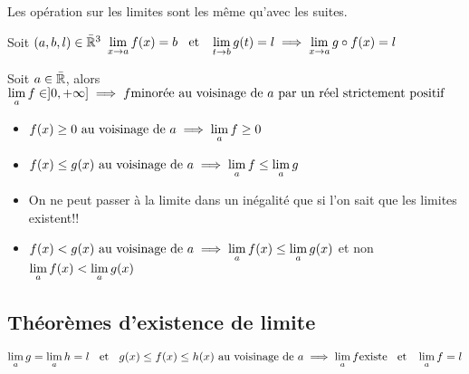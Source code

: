 \begin{rem}
Les opération sur les limites sont les même qu'avec les suites.
\end{rem}

\begin{prp} 
Soit $(a, b, l) \in \bar{\mathbb{R}}^3$
$\lim\limits_{x \to a} f(x) = b \;\;\text{ et }\;\; \lim\limits_{t \to b} g(t) = l
\implies \lim\limits_{x \to a} g \circ f(x) = l$
\end{prp}

\begin{prp} 
Soit $a \in \bar{\mathbb{R}}$, alors
$\lim\limits_{a} f \in ]0, +\infty] \implies f \text{minorée} \text{ au voisinage de }a
\text{ par un réel strictement positif}$
\end{prp}

\begin{prp} 
\begin{itemize}
\item $f(x) \geq 0 \text{ au voisinage de }a \implies \lim\limits_a f \geq 0$
\item $f(x) \leq g(x) \text{ au voisinage de }a \implies
\lim\limits_a f \leq \lim\limits_a g$
\end{itemize}
\end{prp}

\begin{rem} 
\begin{itemize}
    \item 
    \begin{att}
    On ne peut passer à la limite dans un inégalité que si l'on
    sait que les limites existent!!
    \end{att}
    \item
    \begin{att}
    $f(x) < g(x) \text{ au voisinage de }a \implies \lim\limits_a f(x) \leq \lim\limits_a g(x)$
    et non \\ $\lim\limits_a f(x) < \lim\limits_a g(x)$
    \end{att}
\end{itemize}
\end{rem}

\subsection{Théorèmes d'existence de limite}

\begin{thm}[d'encadrement]
$\lim\limits_a g = \lim\limits_a h = l \;\;\text{ et }\;\; g(x) \leq f(x) \leq h(x) \text{ au voisinage de }a
\implies \lim\limits_a f \text{existe} \\ \;\;\text{ et }\;\; \lim\limits_a f = l$
\end{thm}

